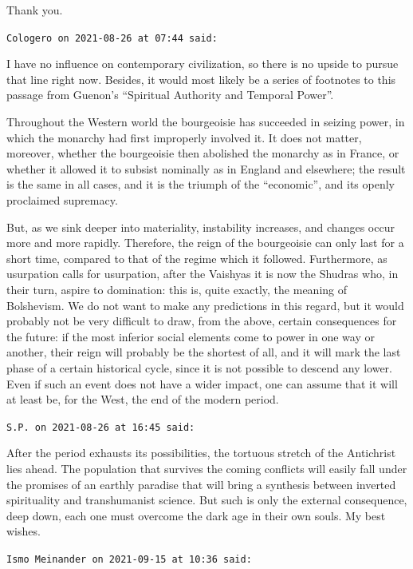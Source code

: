 \begin{footnotesize}
\begin{sffamily}
Thank you.

\hfill

\texttt{Cologero on 2021-08-26 at 07:44 said:}

I have no influence on contemporary civilization, so there is no upside to pursue that line right now. Besides, it would most likely be a series of footnotes to this passage from Guenon's ``Spiritual Authority and Temporal Power''.

Throughout the Western world the bourgeoisie has succeeded in seizing power, in which the monarchy had first improperly involved it. It does not matter, moreover, whether the bourgeoisie then abolished the monarchy as in France, or whether it allowed it to subsist nominally as in England and elsewhere; the result is the same in all cases, and it is the triumph of the ``economic'', and its openly proclaimed supremacy.

But, as we sink deeper into materiality, instability increases, and changes occur more and more rapidly. Therefore, the reign of the bourgeoisie can only last for a short time, compared to that of the regime which it followed. Furthermore, as usurpation calls for usurpation, after the Vaishyas it is now the Shudras who, in their turn, aspire to domination: this is, quite exactly, the meaning of Bolshevism. We do not want to make any predictions in this regard, but it would probably not be very difficult to draw, from the above, certain consequences for the future: if the most inferior social elements come to power in one way or another, their reign will probably be the shortest of all, and it will mark the last phase of a certain historical cycle, since it is not possible to descend any lower. Even if such an event does not have a wider impact, one can assume that it will at least be, for the West, the end of the modern period.

\hfill

\texttt{S.P. on 2021-08-26 at 16:45 said:}

After the period exhausts its possibilities, the tortuous stretch of the Antichrist lies ahead. The population that survives the coming conflicts will easily fall under the promises of an earthly paradise that will bring a synthesis between inverted spirituality and transhumanist science. But such is only the external consequence, deep down, each one must overcome the dark age in their own souls. My best wishes.

\hfill

\texttt{Ismo Meinander on 2021-09-15 at 10:36 said:}


\end{sffamily}
\end{footnotesize}
